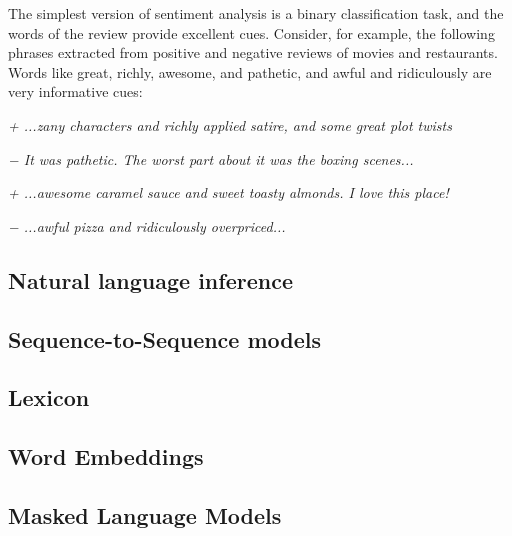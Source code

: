 The simplest version of sentiment analysis is a binary classification task, and
the words of the review provide excellent cues. Consider, for example, the following phrases extracted from positive and negative reviews of movies and restaurants. Words like great, richly, awesome, and pathetic, and awful and ridiculously are very informative cues:

\textit{+ ...zany characters and richly applied satire, and some great plot twists}

\textit{− It was pathetic. The worst part about it was the boxing scenes...}

\textit{+ ...awesome caramel sauce and sweet toasty almonds. I love this place!}

\textit{− ...awful pizza and ridiculously overpriced...} 

\cite{Jurafsky2009}

\subsection{Natural language inference}\label{subsec:nli}


\subsection[Seq2Seq]{Sequence-to-Sequence models}\label{subsec:seq2seq}


\subsection{Lexicon}\label{subsec:lexicon}


\subsection{Word Embeddings}\label{subsec:word-embeddings}


\subsection{Masked Language Models}\label{subsec:masked-language-models}

